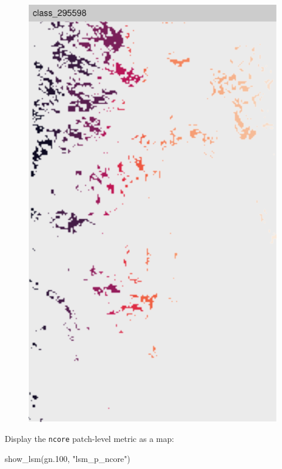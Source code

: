 \documentclass[
  letterpaper,
  DIV=11,
  numbers=noendperiod]{scrartcl}
\newenvironment{Shaded}{\begin{snugshade}}{\end{snugshade}}
\newcommand{\FloatTok}[1]{\textcolor[rgb]{0.68,0.00,0.00}{#1}}
\newcommand{\FunctionTok}[1]{\textcolor[rgb]{0.28,0.35,0.67}{#1}}
\newcommand{\NormalTok}[1]{\textcolor[rgb]{0.00,0.23,0.31}{#1}}
\newcommand{\StringTok}[1]{\textcolor[rgb]{0.13,0.47,0.30}{#1}}
\begin{document}
\begin{figure}[H]

{\centering \includegraphics{PatternAnalysisWorkshopTutorial_files/figure-pdf/show-patches-Erie-100-1.pdf}

}

\end{figure}

Display the \texttt{ncore} patch-level metric as a map:

\begin{Shaded}
\begin{Highlighting}[]
\FunctionTok{show\_lsm}\NormalTok{(gn}\FloatTok{.100}\NormalTok{, }\StringTok{"lsm\_p\_ncore"}\NormalTok{)}
\end{Highlighting}
\end{Shaded}
\end{document}
